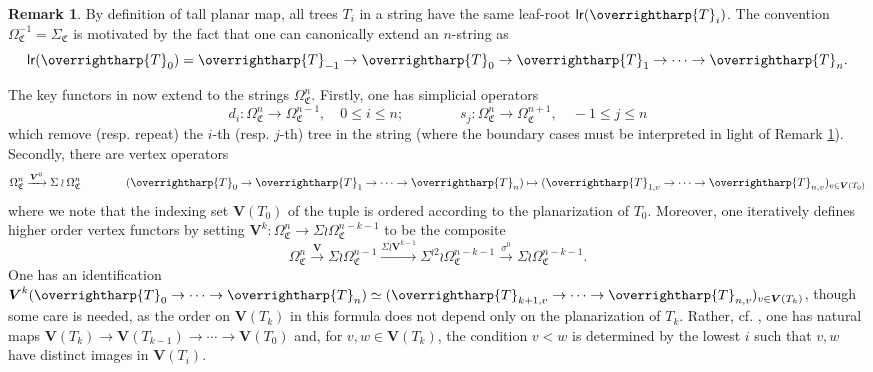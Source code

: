 \documentclass[a4paper,10pt
]{article}%
\numberwithin{equation}{section}
\numberwithin{figure}{section}
\theoremstyle{definition} %
\newtheorem{remark}[equation]{Remark}%
\newcommand{\vect}[1]{\text{\overrightharp{\ensuremath{#1}}}}
\newcommand{\1}{\ensuremath{\mathbbm 1}}%
\begin{document}
\begin{remark}\label{ADDCOROL REM}
	By definition of tall planar map, 
	all trees $T_i$ in a string have the same leaf-root
	$\mathsf{lr}(\vect{T}_i)$. The convention $\Omega^{-1}_{\mathfrak{C}} = \Sigma_{\mathfrak{C}}$ 
	is motivated by the fact that one can 
	canonically extend an $n$-string as
	\[\mathsf{lr}(\vect{T}_0)=\vect{T}_{-1} \to \vect{T}_0 \to \vect{T}_1 \to \cdots \to \vect{T}_n.\]
\end{remark}




The key functors in \cite[\S 3.4]{BP21} now extend to the strings
$\Omega_{\mathfrak{C}}^n$.
Firstly, one has simplicial operators
\[
d_i \colon \Omega_{\mathfrak{C}}^n \to \Omega_{\mathfrak{C}}^{n-1},
\quad 0 \leq i \leq n;
\qquad \qquad
s_j \colon \Omega_{\mathfrak{C}}^{n} \to \Omega_{\mathfrak{C}}^{n+1},
\quad -1 \leq j \leq n
\]
which remove (resp. repeat) the $i$-th (resp. $j$-th) tree in the string (where the boundary cases must be interpreted in light of 
Remark \ref{ADDCOROL REM}).
Secondly, there are vertex operators
\[
\Omega^{n}_{\mathfrak{C}}
\xrightarrow{\boldsymbol{V}^0}
\Sigma \wr \Omega^{n}_{\mathfrak{C}}
\qquad \qquad
(\vect{T}_0 \to \vect{T}_1 \to \cdots \to \vect{T}_n)
\mapsto
(\vect{T}_{1,v} \to \cdots \to \vect{T}_{n,v})_{v \in \boldsymbol{V}(T_0)}
\]
where we note that the indexing set 
$\boldsymbol{V}(T_0)$ of the tuple
is ordered according to the planarization of $T_0$.
Moreover, one iteratively defines higher order vertex functors
by setting 
$\boldsymbol{V}^{k}\colon \Omega^{n}_{\mathfrak{C}}
\to \Sigma \wr \Omega^{n-k-1}_{\mathfrak{C}}$
to be the composite
\begin{equation}\label{VKDEF EQ}
\Omega^{n}_{\mathfrak{C}}
\xrightarrow{\boldsymbol{V}}
\Sigma \wr\Omega^{n-1}_{\mathfrak{C}}
\xrightarrow{\Sigma \wr \boldsymbol{V}^{k-1}}
\Sigma^{\wr 2} \wr \Omega^{n-k-1}_{\mathfrak{C}}
\xrightarrow{\sigma^0}
\Sigma \wr \Omega^{n-k-1}_{\mathfrak{C}}.
\end{equation}
One has an identification
$\boldsymbol{V}^k(\vect{T}_0 \to \cdots \to \vect{T}_n)
\simeq (\vect{T}_{k+1,v} \to \cdots \to \vect{T}_{n,v})_{v \in \boldsymbol{V}(T_k)}$, though some care is needed,
as the order on $\boldsymbol{V}(T_k)$ in this formula
does not depend only on the planarization of $T_k$.
Rather, cf. \cite[(3.99)]{BP21},
one has natural maps 
$\boldsymbol{V}(T_k) \to \boldsymbol{V}(T_{k-1}) 
\to \cdots
\to \boldsymbol{V}(T_{0})$
and, for $v,w \in \boldsymbol{V}(T_k)$,
the condition $v<w$
is determined by the lowest $i$
such that $v,w$ have distinct images in 
$\boldsymbol{V}(T_i)$.
\end{document}
